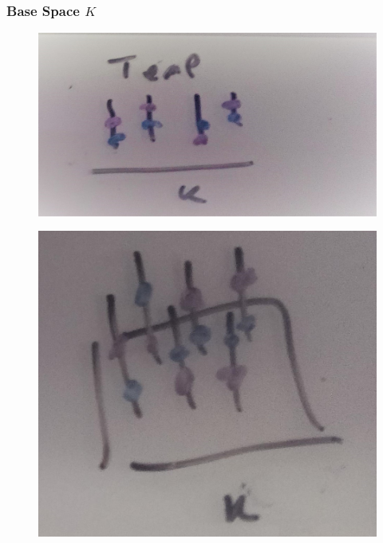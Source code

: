 \documentclass[../main.tex]{subfiles}
\begin{document}
\subsubsection{Base Space $K$}
\begin{figure}
    \includegraphics{figures/sections/math/temp_1k.png}
\end{figure}
\begin{figure}
    \includegraphics{figures/sections/math/temp_2k.png}
\end{figure}
\end{document}
